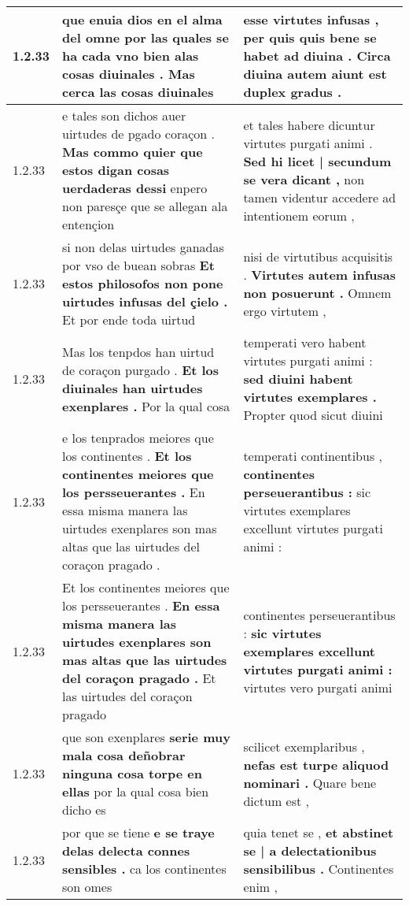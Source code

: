 \begin{tabular}{|p{1cm}|p{6.5cm}|p{6.5cm}|}
1.2.33 & que enuia dios en el alma del omne \textbf{ por las quales se ha cada vno bien alas cosas diuinales . } Mas cerca las cosas diuinales & esse virtutes infusas , \textbf{ per quis quis bene se habet ad diuina . } Circa diuina autem aiunt est duplex gradus . \\\hline
1.2.33 & e tales son dichos auer uirtudes de pgado coraçon . \textbf{ Mas commo quier que estos digan cosas uerdaderas dessi } enpero non paresçe que se allegan ala entençion & et tales habere dicuntur virtutes purgati animi . \textbf{ Sed hi licet | secundum se vera dicant , } non tamen videntur accedere ad intentionem eorum , \\\hline
1.2.33 & si non delas uirtudes ganadas por vso de buean sobras \textbf{ Et estos philosofos non pone uirtudes infusas del çielo . } Et por ende toda uirtud & nisi de virtutibus acquisitis . \textbf{ Virtutes autem infusas non posuerunt . } Omnem ergo virtutem , \\\hline
1.2.33 & Mas los tenpdos han uirtud de coraçon purgado . \textbf{ Et los diuinales han uirtudes exenplares . } Por la qual cosa & temperati vero habent virtutes purgati animi : \textbf{ sed diuini habent virtutes exemplares . } Propter quod sicut diuini \\\hline
1.2.33 & e los tenprados meiores que los continentes . \textbf{ Et los continentes meiores que los persseuerantes . } En essa misma manera las uirtudes exenplares son mas altas que las uirtudes del coraçon pragado . & temperati continentibus , \textbf{ continentes perseuerantibus : } sic virtutes exemplares excellunt virtutes purgati animi : \\\hline
1.2.33 & Et los continentes meiores que los persseuerantes . \textbf{ En essa misma manera las uirtudes exenplares son mas altas que las uirtudes del coraçon pragado . } Et las uirtudes del coraçon pragado & continentes perseuerantibus : \textbf{ sic virtutes exemplares excellunt virtutes purgati animi : } virtutes vero purgati animi \\\hline
1.2.33 & que son exenplares \textbf{ serie muy mala cosa deñobrar ninguna cosa torpe en ellas } por la qual cosa bien dicho es & scilicet exemplaribus , \textbf{ nefas est turpe aliquod nominari . } Quare bene dictum est , \\\hline
1.2.33 & por que se tiene \textbf{ e se traye delas delecta connes sensibles . } ca los continentes son omes & quia tenet se , \textbf{ et abstinet se | a delectationibus sensibilibus . } Continentes enim , \\\hline

\end{tabular}

